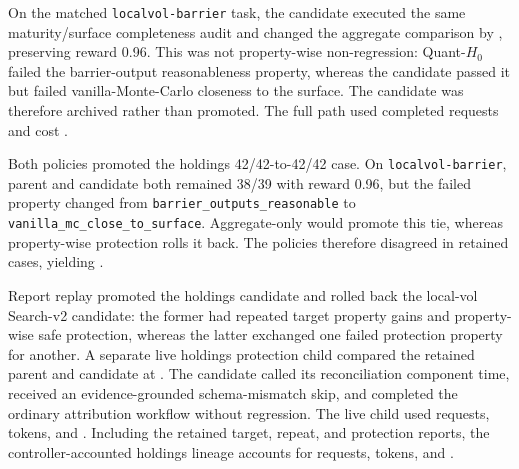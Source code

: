 On the matched \texttt{localvol-barrier} task, the candidate executed the same
maturity/surface completeness audit and changed the aggregate comparison by
\QStateVTwoMatched{}, preserving reward 0.96. This was not property-wise
non-regression: Quant-$H_0$ failed the barrier-output reasonableness property,
whereas the candidate passed it but failed vanilla-Monte-Carlo closeness to the
surface. The candidate was therefore archived rather than promoted. The full
path used \QStateVTwoRequests{} completed requests and cost
\QStateVTwoCost{}. 

 Both policies promoted the holdings 42/42-to-42/42 case. On
\texttt{localvol-barrier}, parent and candidate both remained 38/39 with reward
0.96, but the failed property changed from
\texttt{barrier\_outputs\_reasonable} to
\texttt{vanilla\_mc\_close\_to\_surface}. Aggregate-only would promote this
tie, whereas property-wise protection rolls it back. The policies therefore
disagreed in \ProtectionAblationDisagreements{} retained cases, yielding
\ProtectionAblationStatus{}. 

 Report replay promoted
the holdings candidate and rolled back the local-vol Search-v2 candidate: the
former had repeated target property gains and property-wise safe protection,
whereas the latter exchanged one failed protection property for another. A
separate live holdings protection child compared the retained parent and
candidate at \ThinMainZeroProtection{}. The candidate called its reconciliation
component \ThinMainZeroComponentCalls{} time, received an evidence-grounded
schema-mismatch skip, and completed the ordinary attribution workflow without
regression. The live child used \ThinMainZeroLiveRequests{} requests,
\ThinMainZeroLiveTokens{} tokens, and \ThinMainZeroLiveCost{}. Including the
retained target, repeat, and protection reports, the controller-accounted
holdings lineage accounts for \ThinMainZeroLineageRequests{} requests,
\ThinMainZeroLineageTokens{} tokens, and \ThinMainZeroLineageCost{}.

